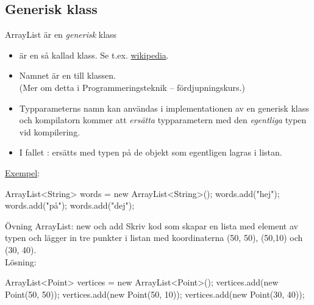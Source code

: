 \subsection{Generisk klass}
\begin{Slide}{ArrayList är en \emph{generisk} klass}\footnotesize
\begin{itemize}
\item {} är en så kallad   klass. Se t.ex. \href{https://en.wikipedia.org/wiki/Generics_in_Java}{wikipedia}.
\item Namnet  är en  till klassen. \\(Mer om detta i Programmeringsteknik – fördjupningskurs.)
\item Typparameterns namn kan användas i implementationen av en generisk klass och kompilatorn kommer att \emph{ersätta} typparametern med den \emph{egentliga} typen vid kompilering.
\item I fallet :  ersätts med typen på de objekt som egentligen lagras i listan.  
\end{itemize}
\href{https://github.com/lunduniversity/introprog/tree/master/compendium/examples/scalajava/generics/TestGenerics.java}{Exempel}:
\begin{Code}[numberstyle=]
        ArrayList<String> words = new ArrayList<String>();
        words.add("hej");
        words.add("på");
        words.add("dej");
\end{Code}
\end{Slide}

\begin{Slide}{Övning ArrayList: new och add}
Skriv kod som skapar en lista med element av typen  och lägger in tre punkter i listan med koordinaterna (50, 50), (50,10) och (30, 40).
\pause
\\\vspace{1em} Lösning: \\\vspace{1em} 
\begin{Code}[numberstyle=]
ArrayList<Point> vertices = new ArrayList<Point>(); 
vertices.add(new Point(50, 50));
vertices.add(new Point(50, 10)); 
vertices.add(new Point(30, 40)); 
\end{Code}


\end{Slide}

